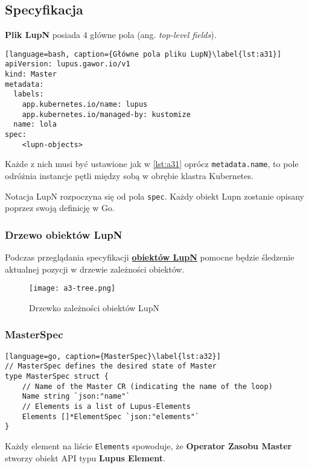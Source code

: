 \subsection{Specyfikacja}

\textbf{Plik LupN} posiada 4 główne pola (ang. \textit{top-level fields}).

\begin{lstlisting}[language=bash, caption={Główne pola pliku LupN}\label{lst:a31}]
apiVersion: lupus.gawor.io/v1
kind: Master
metadata:
  labels:
    app.kubernetes.io/name: lupus
    app.kubernetes.io/managed-by: kustomize
  name: lola
spec:
	<lupn-objects>
\end{lstlisting}

Każde z nich musi być ustawione jak w \ref{lst:a31} oprócz \texttt{metadata.name}, to pole odróżnia instancje pętli między sobą w obrębie klastra Kubernetes.

Notacja LupN rozpoczyna się od pola \texttt{spec}. Każdy obiekt Lupn zostanie opisany poprzez swoją definicję w Go.

\subsubsection{Drzewo obiektów LupN}

Podczas przeglądania specyfikacji \hyperlink{def:obiekt-lupn}{\textbf{obiektów LupN}} pomocne będzie śledzenie aktualnej pozycji w drzewie zależności obiektów. 

\begin{figure}[!h]
    \centering \texttt{[image: a3-tree.png]}
    \caption{Drzewko zależności obiektów LupN}\label{fig:a3-tree}
\end{figure}

\subsubsection{MasterSpec}
\begin{lstlisting}[language=go, caption={MasterSpec}\label{lst:a32}]
// MasterSpec defines the desired state of Master
type MasterSpec struct {
	// Name of the Master CR (indicating the name of the loop)
	Name string `json:"name"`
	// Elements is a list of Lupus-Elements
	Elements []*ElementSpec `json:"elements"`
}
\end{lstlisting}
Każdy element na liście \texttt{Elements} spowoduje, że \textbf{Operator Zasobu Master} stworzy obiekt API typu \textbf{Lupus Element}. 


